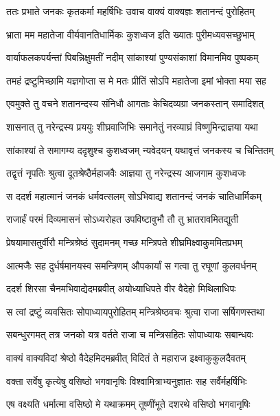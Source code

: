 
\twolineshloka
{ततः प्रभाते जनकः कृतकर्मा महर्षिभिः}
{उवाच वाक्यं वाक्यज्ञः शतानन्दं पुरोहितम्} %

\twolineshloka
{भ्राता मम महातेजा वीर्यवानतिधार्मिकः}
{कुशध्वज इति ख्यातः पुरीमध्यवसच्छुभाम्} %

\twolineshloka
{वार्याफलकपर्यन्तां पिबन्निक्षुमतीं नदीम्}
{सांकाश्यां पुण्यसंकाशां विमानमिव पुष्पकम्} %

\twolineshloka
{तमहं द्रष्टुमिच्छामि यज्ञगोप्ता स मे मतः}
{प्रीतिं सोऽपि महातेजा इमां भोक्ता मया सह} %

\twolineshloka
{एवमुक्ते तु वचने शतानन्दस्य संनिधौ}
{आगताः केचिदव्यग्रा जनकस्तान् समादिशत्} %

\twolineshloka
{शासनात् तु नरेन्द्रस्य प्रययुः शीघ्रवाजिभिः}
{समानेतुं नरव्याघ्रं विष्णुमिन्द्राज्ञया यथा} %

\twolineshloka
{सांकाश्यां ते समागम्य ददृशुश्च कुशध्वजम्}
{न्यवेदयन् यथावृत्तं जनकस्य च चिन्तितम्} %

\twolineshloka
{तद्वृत्तं नृपतिः श्रुत्वा दूतश्रेष्ठैर्महाजवैः}
{आज्ञया तु नरेन्द्रस्य आजगाम कुशध्वजः} %

\twolineshloka
{स ददर्श महात्मानं जनकं धर्मवत्सलम्}
{सोऽभिवाद्य शतानन्दं जनकं चातिधार्मिकम्} %

\twolineshloka
{राजार्हं परमं दिव्यमासनं सोऽध्यरोहत}
{उपविष्टावुभौ तौ तु भ्रातरावमितद्युती} %

\twolineshloka
{प्रेषयामासतुर्वीरौ मन्त्रिश्रेष्ठं सुदामनम्}
{गच्छ मन्त्रिपते शीघ्रमिक्ष्वाकुममितप्रभम्} %

\twolineshloka
{आत्मजैः सह दुर्धर्षमानयस्व समन्त्रिणम्}
{औपकार्यां स गत्वा तु रघूणां कुलवर्धनम्} %

\twolineshloka
{ददर्श शिरसा चैनमभिवाद्येदमब्रवीत्}
{अयोध्याधिपते वीर वैदेहो मिथिलाधिपः} %

\twolineshloka
{स त्वां द्रष्टुं व्यवसितः सोपाध्यायपुरोहितम्}
{मन्त्रिश्रेष्ठवचः श्रुत्वा राजा सर्षिगणस्तथा} %

\twolineshloka
{सबन्धुरगमत् तत्र जनको यत्र वर्तते}
{राजा च मन्त्रिसहितः सोपाध्यायः सबान्धवः} %

\twolineshloka
{वाक्यं वाक्यविदां श्रेष्ठो वैदेहमिदमब्रवीत्}
{विदितं ते महाराज इक्ष्वाकुकुलदैवतम्} %

\twolineshloka
{वक्ता सर्वेषु कृत्येषु वसिष्ठो भगवानृषिः}
{विश्वामित्राभ्यनुज्ञातः सह सर्वैर्महर्षिभिः} %

\twolineshloka
{एष वक्ष्यति धर्मात्मा वसिष्ठो मे यथाक्रमम्}
{तूष्णींभूते दशरथे वसिष्ठो भगवानृषिः} %

